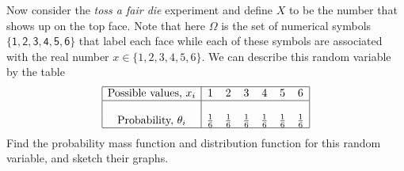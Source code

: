 \begin{example}\label{Eg:FairDicerandomVariable}
Now consider the {\em toss a fair die} experiment and define $X$ to be the number that shows up on the top face. 
Note that here $\Omega$ is the set of numerical symbols $\{\mathsf{1}, \mathsf{2}, \mathsf{3}, \mathsf{4}, \mathsf{5}, \mathsf{6}\}$ 
that label each face while each of these symbols are associated with the real number 
$x \in \{1,2,3,4,5,6\}$. 
We can describe this random variable by the table 
$$\begin{array}{|c|cccccc|}\hline
\textrm{Possible values, $x_i$}&1&2&3&4&5&6 \\ \hline
&&&&&&\\
\textrm{Probability, $\theta_i$} &\frac{1}{6}&\frac{1}{6}&\frac{1}{6}&\frac{1}{6}&\frac{1}{6}&\frac{1}{6}\\ \hline
\end{array}
$$
Find the probability mass function and distribution function for this random variable, and sketch their graphs.


\end{example}
